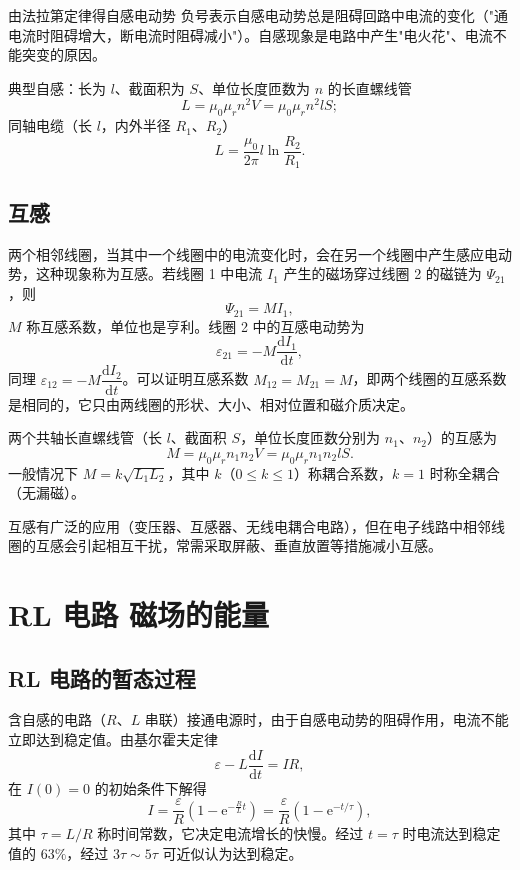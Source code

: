     由法拉第定律得自感电动势
    负号表示自感电动势总是阻碍回路中电流的变化（"通电流时阻碍增大，断电流时阻碍减小"）。自感现象是电路中产生"电火花"、电流不能突变的原因。

    典型自感：长为 $l$、截面积为 $S$、单位长度匝数为 $n$ 的长直螺线管
    \[
    L=\mu_0\mu_rn^{2}V=\mu_0\mu_rn^{2}lS;
    \]
    同轴电缆（长 $l$，内外半径 $R_1$、$R_2$）
    \[
    L=\frac{\mu_0}{2\pi}l\ln\frac{R_2}{R_1}.
    \]

    \subsection{互感}
    两个相邻线圈，当其中一个线圈中的电流变化时，会在另一个线圈中产生感应电动势，这种现象称为互感。若线圈 1 中电流 $I_1$ 产生的磁场穿过线圈 2 的磁链为 $\Psi_{21}$，则
    \[
    \Psi_{21}=MI_1,
    \]
    $M$ 称互感系数，单位也是亨利。线圈 2 中的互感电动势为
    \[
    \varepsilon_{21}=-M\frac{\mathrm{d}I_1}{\mathrm{d}t},
    \]
    同理 $\varepsilon_{12}=-M\dfrac{\mathrm{d}I_2}{\mathrm{d}t}$。可以证明互感系数 $M_{12}=M_{21}=M$，即两个线圈的互感系数是相同的，它只由两线圈的形状、大小、相对位置和磁介质决定。

    两个共轴长直螺线管（长 $l$、截面积 $S$，单位长度匝数分别为 $n_1$、$n_2$）的互感为
    \[
    M=\mu_0\mu_rn_1n_2V=\mu_0\mu_rn_1n_2lS.
    \]
    一般情况下 $M=k\sqrt{L_1L_2}$，其中 $k$（$0\le k\le1$）称耦合系数，$k=1$ 时称全耦合（无漏磁）。

    互感有广泛的应用（变压器、互感器、无线电耦合电路），但在电子线路中相邻线圈的互感会引起相互干扰，常需采取屏蔽、垂直放置等措施减小互感。


\section{RL 电路 磁场的能量}
    \subsection{RL 电路的暂态过程}
    含自感的电路（$R$、$L$ 串联）接通电源时，由于自感电动势的阻碍作用，电流不能立即达到稳定值。由基尔霍夫定律
    \[
    \varepsilon-L\frac{\mathrm{d}I}{\mathrm{d}t}=IR,
    \]
    在 $I(0)=0$ 的初始条件下解得
    \[
    I=\frac{\varepsilon}{R}\left(1-\mathrm{e}^{-\frac{R}{L}t}\right)=\frac{\varepsilon}{R}\left(1-\mathrm{e}^{-t/\tau}\right),
    \]
    其中 $\tau=L/R$ 称时间常数，它决定电流增长的快慢。经过 $t=\tau$ 时电流达到稳定值的 $63\%$，经过 $3\tau\sim5\tau$ 可近似认为达到稳定。

